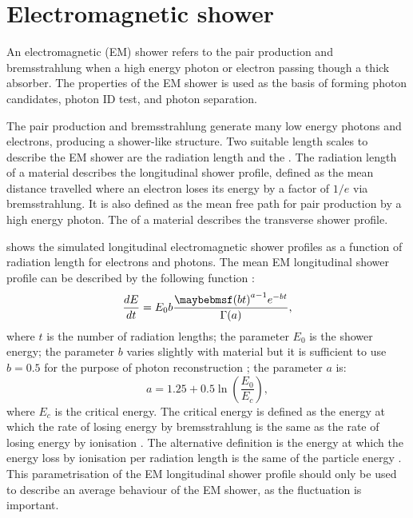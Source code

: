 

\section{Electromagnetic shower}
\label{sec:photonEMshower}
An electromagnetic (EM) shower refers to the pair production and bremsstrahlung when a high energy photon or electron passing though a thick absorber. The properties of the EM shower is used as the basis of forming photon candidates, photon ID test, and photon separation.

The pair production and bremsstrahlung generate many low energy photons and electrons, producing a shower-like  structure. Two suitable length scales to describe the EM shower are the radiation length and the \RM. The radiation length of a material describes the longitudinal shower profile, defined as the mean distance travelled where an electron loses its energy by a factor of $1/e$ via bremsstrahlung. It is also defined as the mean free path  for pair production by a high energy photon\cite{segre1977nuclei}. The \RM of a material describes the transverse shower profile.


 shows the simulated longitudinal electromagnetic shower profiles as a function of radiation length for electrons and photons. The mean EM longitudinal shower profile can be described by the following function \cite{Longo:1975wb} :
\begin{equation}
\frac{dE}{dt} = E_0 b \frac{\parenths{bt}^{a-1}e^{-bt}}{\Gamma(a)},
\label{eq:photonEMshower}
\end{equation}
where $t$ is the number of radiation lengths; the parameter $E_0$ is the shower energy; the parameter $b$ varies slightly with material but it is sufficient to use $b = 0.5$ for the purpose of photon reconstruction \cite{Agashe:2014kda}; the parameter $a$ is:
\begin{equation}
a = 1.25 + 0.5\ln\left(\frac{E_0}{E_c}\right),
\end{equation}
where $E_c$ is the critical energy. The critical energy is defined as the energy at which the rate of losing energy by bremsstrahlung is the same as the rate of losing energy by ionisation \cite{1964NASSP3012.....B}. The alternative definition is the energy at which the energy loss by ionisation per radiation length is the same of the particle energy \cite{rossi1952high}. This parametrisation of the EM longitudinal shower profile should only be used to describe an average behaviour of the EM shower, as the fluctuation is important.

